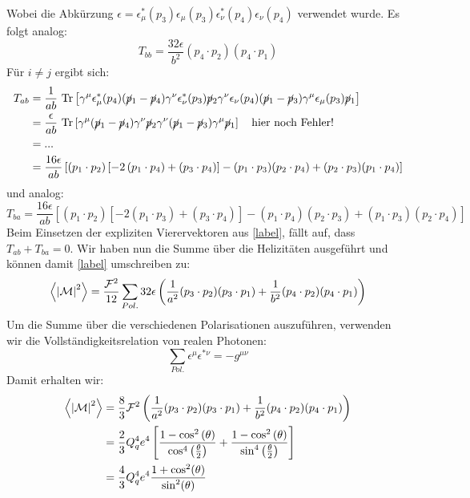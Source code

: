 Wobei die Abkürzung $\epsilon = \epsilon^*_\mu(p_3)\epsilon_\mu(p_3)\epsilon_\nu^*(p_4)\epsilon_\nu(p_4)$ verwendet wurde. Es folgt analog:
\begin{equation}
	T_{bb} = \frac{32\epsilon}{b^2}(p_4\cdot p_2)(p_4\cdot p_1)
\end{equation}
Für $i \neq j$ ergibt sich:
\begin{equation}
	\begin{aligned}
	T_{ab} &= \frac{1}{ab}~\text{Tr}\left[\gamma^\mu \epsilon^*_\mu(p_4) (\cancel{p}_1- \cancel{p}_4)  \gamma^\nu \epsilon_\nu^*(p_3) \cancel{p}_2 \gamma^\nu \epsilon_\nu(p_4) (\cancel{p}_1- \cancel{p}_3)  \gamma^\mu \epsilon_\mu(p_3) \cancel{p}_1 \right] \\
	&=\frac{\epsilon}{ab}~\text{Tr}\left[\gamma^\mu (\cancel{p}_1- \cancel{p}_4)  \gamma^\nu \cancel{p}_2 \gamma^\nu (\cancel{p}_1- \cancel{p}_3)  \gamma^\mu \cancel{p}_1 \right] \quad \text{hier noch Fehler!} \\
	&= ... \\
	&=  \frac{16 \epsilon}{ab} \left[\left( p_1\cdot p_2\right) \left[ -2 \left( p_1 \cdot p_4 \right) + \left(p_3 \cdot p_4\right)\right] - (p_1\cdot p_3)(p_2\cdot p_4) + (p_2\cdot p_3)(p_1\cdot p_4)\right]
	\end{aligned}
\end{equation}
und analog:
\begin{equation}
	T_{ba} = \frac{16 \epsilon}{ab} \left[\left( p_1\cdot p_2\right) \left[ -2 \left( p_1 \cdot p_3 \right) + \left(p_3 \cdot p_4\right)\right] - (p_1\cdot p_4)(p_2\cdot p_3) + (p_1\cdot p_3)(p_2\cdot p_4)\right]
\end{equation}
Beim Einsetzen der expliziten Vierervektoren aus \autoref{label}, fällt auf, dass $T_{ab} + T_{ba} = 0$. Wir haben nun die Summe über die Helizitäten ausgeführt und können damit \autoref{label} umschreiben zu:
\begin{equation}
	\left\langle  \abs{\mathcal{M}}^2\right\rangle = \frac{\mathcal{F}^2}{12}\sum_{Pol.}32 \epsilon\left(\frac{1}{a^2}(p_3\cdot p_2)(p_3\cdot p_1) + \frac{1}{b^2} (p_4\cdot p_2)(p_4\cdot p_1) \right)
\end{equation}
Um die Summe über die verschiedenen Polarisationen auszuführen, verwenden wir die Vollständigkeitsrelation von realen Photonen:
\begin{equation}
	\sum_{Pol.} \epsilon^\mu \epsilon^{*\nu} = -g^{\mu \nu}
\end{equation}
Damit erhalten wir:
\begin{equation}
	\begin{aligned}
		\left\langle  \abs{\mathcal{M}}^2\right\rangle &= \frac{8}{3}\mathcal{F}^2 \left(\frac{1}{a^2}(p_3\cdot p_2)(p_3\cdot p_1) + \frac{1}{b^2} (p_4\cdot p_2)(p_4\cdot p_1) \right) \\
		&= \frac{2}{3}Q_q^4e^4\left[\frac{1-\cos^2\left(\theta\right)}{\cos^4\left(\frac{\theta}{2}\right)} + \frac{1-\cos^2\left(\theta\right)}{\sin^4\left(\frac{\theta}{2}\right)}\right] \\
		&=\frac{4}{3} Q_q^4e^4\frac{1+\cos^2(\theta)}{\sin^2(\theta)}
	\end{aligned}
\end{equation}
